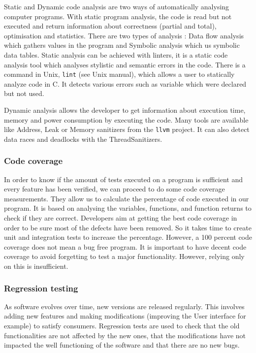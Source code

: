 Static and Dynamic code analysis are two ways of automatically analysing computer programs. With static program analysis, the code is read but not executed and return information about correctness (partial and total), optimisation and statistics. There are two types of analysis : Data flow analysis which gathers values in the program and Symbolic analysis which us symbolic data tables.
Static analysis can be achieved with linters, it is a static code analysis tool which analyses stylistic and semantic errors in the code. There is a command in Unix, \texttt{lint} (see Unix manual), which allows a user to statically analyze code in C. It detects various errors such as variable which were declared but not used.

Dynamic analysis allows the developer to get information about execution time, memory and power consumption by executing the code. Many tools are available like Address, Leak or Memory sanitizers from the \texttt{llvm} project. It can also detect data races and deadlocks with the ThreadSanitizers.\cite{4815280}

\subsubsection{Code coverage}
In order to know if the amount of tests executed on a program is sufficient and every feature has been verified, we can proceed to do some code coverage measurements. They allow us to calculate the percentage of code executed in our program. It is based on analysing the variables, functions, and function returns to check if they are correct. Developers aim at getting the best code coverage in order to be sure most of the defects have been removed. So it takes time to create unit and integration tests to increase the percentage. However, a 100 percent code coverage does not mean a bug free program. It is important to have decent code coverage to avoid forgetting to test a major functionality. However, relying only on this is insufficient.\cite{8804437}

\subsubsection{Regression testing}
    As software evolves over time, new versions are released regularly. This involves adding new features and making modifications (improving the User interface for example) to satisfy consumers. Regression tests are used to check that the old functionalities are not affected by the new ones, that the modifications have not impacted the well functioning of the software and that there are no new bugs.\cite{regression}
    
